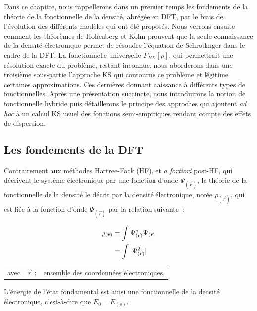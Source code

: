 	Dans ce chapitre, nous rappellerons dans un premier temps les fondements de la théorie de la fonctionnelle de la densité, abrégée en DFT, par le biais de l'évolution des différents modèles qui ont été proposés. Nous verrons ensuite comment les théorèmes de Hohenberg et Kohn prouvent que la seule connaissance de la densité électronique permet de résoudre l'équation de Schr\"{o}dinger dans le cadre de la DFT. La fonctionnelle universelle $F_{HK}[\rho]$, qui permettrait une résolution exacte du problème, restant inconnue, nous aborderons dans une troisième sous-partie l'approche KS qui contourne ce problème et légitime certaines approximations. Ces dernières donnant naissance à différents types de fonctionnelles. Après une présentation succincte, nous introduirons la notion de fonctionnelle hybride puis détaillerons le principe des approches qui ajoutent \textit{ad hoc} à un calcul KS usuel des fonctions semi-empiriques rendant compte des effets de dispersion.
	
	\subsection{Les fondements de la DFT}
	
	Contrairement aux méthodes Hartree-Fock (HF), et \textit{a fortiori} post-HF, qui décrivent le système électronique par une fonction d'onde $\Psi_{(\vec{r})}$, la théorie de la fonctionnelle de la densité le décrit par la densité électronique, notée $\rho_{(\vec{r})}$, qui est liée à la fonction d'onde $\Psi_{(\vec{r})}$ par la relation suivante~:
	
	\begin{align}
	\rho_{(\vec{r})} &= \int \Psi_{(\vec{r})}^{*} \Psi_{(\vec{r})} \\
	&= \int |\Psi_{(\vec{r})}^{2}| \notag
	\end{align}
	
	\begin{flushleft}
		\begin{tabular}{@{}lrp{10cm}}
			avec & $\vec{r}$ : & ensemble des coordonnées électroniques. 
		\end{tabular}
	\end{flushleft}
	
	
	L'énergie de l'état fondamental est ainsi une fonctionnelle de la densité électronique, c'est-à-dire que $E_{0} = E_{(\rho)}$.
	
